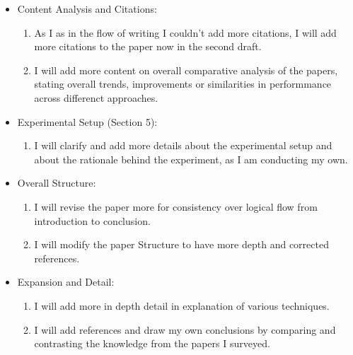 \documentclass{article}[12pt]
\begin{document}
\begin{itemize}
    \item Content Analysis and Citations:
    \begin{enumerate}
        \item As I as in the flow of writing I couldn't add more citations, I will add more citations to the paper now in the second draft.
        \item I will add more content on overall comparative analysis of the papers, stating overall trends, improvements or similarities in performmance across differenct approaches. 
    \end{enumerate}
    \item Experimental Setup (Section 5):
    \begin{enumerate}
        \item I will clarify and add more details about the experimental setup and about the rationale behind the experiment, as I am conducting my own.
    \end{enumerate}
    \item Overall Structure:
    \begin{enumerate}
        \item I will revise the paper more for consistency over logical flow from introduction to conclusion. 
        \item I will modify the paper Structure to have more depth and corrected references. 
    \end{enumerate}
    \item Expansion and Detail:
    \begin{enumerate}
        \item I will add more in depth detail in explanation of various techniques. 
        \item I will add references and draw my own conclusions by comparing and contrasting the knowledge from the papers I surveyed.
    \end{enumerate}
\end{itemize}
\end{document}
